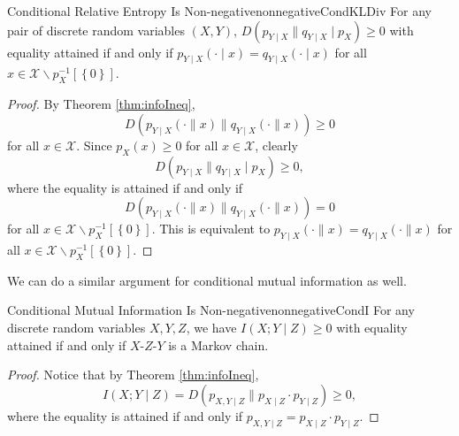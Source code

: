 \documentclass[math]{amznotes}
\theoremstyle{remark}
\begin{document}
\begin{corbox}{Conditional Relative Entropy Is Non-negative}{nonnegativeCondKLDiv}
    For any pair of discrete random variables $\left(X, Y\right)$, $D\left(p_{Y \mid X} \parallel q_{Y \mid X} \mid p_X\right) \geq 0$ with equality attained if and only if $p_{Y \mid X}\left(\cdot \mid x\right) = q_{Y \mid X}\left(\cdot \mid x\right)$ for all $x \in \mathcal{X} \backslash p_X^{-1}\left[\left\{0\right\}\right]$. 
    \tcblower
    \begin{proof}
        By Theorem \ref{thm:infoIneq}, 
        \begin{equation*}
            D\left(p_{Y \mid X}\left(\cdot \parallel x\right) \parallel q_{Y \mid X}\left(\cdot \parallel x\right)\right) \geq 0
        \end{equation*}
        for all $x \in \mathcal{X}$. Since $p_X\left(x\right) \geq 0$ for all $x \in \mathcal{X}$, clearly 
        \begin{equation*}
            D\left(p_{Y \mid X} \parallel q_{Y \mid X} \mid p_X\right) \geq 0,
        \end{equation*}
        where the equality is attained if and only if 
        \begin{equation*}
            D\left(p_{Y \mid X}\left(\cdot \parallel x\right) \parallel q_{Y \mid X}\left(\cdot \parallel x\right)\right) = 0
        \end{equation*}
        for all $x \in \mathcal{X} \backslash p_X^{-1}\left[\left\{0\right\}\right]$. This is equivalent to $p_{Y \mid X}\left(\cdot \parallel x\right) = q_{Y \mid X}\left(\cdot \parallel x\right)$ for all $x \in \mathcal{X} \backslash p_X^{-1}\left[\left\{0\right\}\right]$.
    \end{proof}
\end{corbox}
We can do a similar argument for conditional mutual information as well.
\begin{corbox}{Conditional Mutual Information Is Non-negative}{nonnegativeCondI}
    For any discrete random variables $X, Y, Z$, we have $I\left(X ; Y \mid Z\right) \geq 0$ with equality attained if and only if $X$-$Z$-$Y$ is a Markov chain.
    \tcblower
    \begin{proof}
        Notice that by Theorem \ref{thm:infoIneq},
        \begin{equation*}
            I\left(X ; Y \mid Z\right) = D\left(p_{X, Y \mid Z} \parallel p_{X \mid Z} \cdot p_{Y \mid Z}\right) \geq 0,
        \end{equation*}
        where the equality is attained if and only if $p_{X, Y \mid Z} = p_{X \mid Z} \cdot p_{Y \mid Z}$. 
    \end{proof}
\end{corbox}
\end{document}
